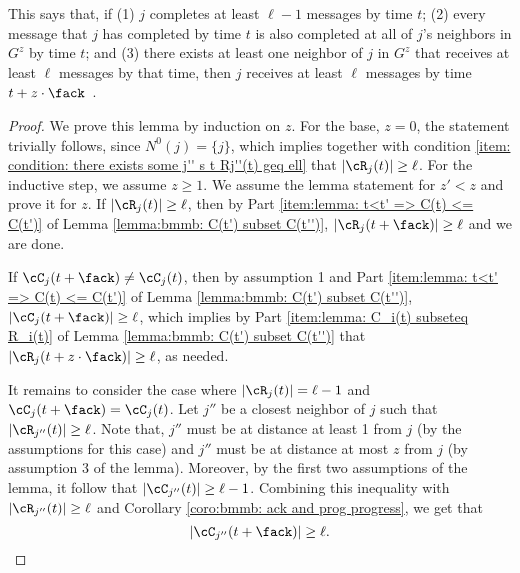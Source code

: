 \noindent This says that, if
(1) $j$ completes at least $\ell-1$ messages by time $t$;
(2) every message that $j$ has completed by time $t$ is also completed at all of $j$'s
neighbors in $G^z$ by time $t$; and
(3) there exists at least one neighbor of $j$ in $G^z$ that receives at least $\ell$ messages by that time,
then $j$ receives
at least $\ell$ messages by time $t+ z\cdot \fack$~.


\begin{proof}
We prove this lemma by induction on $z$.
For the base, $z= 0$, the statement trivially follows, since $N^0(j)=\{j\}$, which implies together with condition
\ref{item: condition: there exists some j'' s t Rj''(t) geq ell} that $|\cR_{j}(t) |\geq \ell$.
For the inductive step, we assume $z \geq 1$.
We assume the lemma statement for $z'<z$ and prove it for $z$.
If $|\cR_j(t)| \geq \ell$, then
by Part \ref{item:lemma: t<t' => C(t) <= C(t')}
of Lemma \ref{lemma:bmmb: C(t') subset C(t'')},
$|\cR_j(t+\fack)| \geq \ell$ and we are done.


If $\cC_{j}(t+\fack) \not= \cC_{j}(t)$, then by  assumption 1
and Part
\ref{item:lemma: t<t' => C(t) <= C(t')}
of Lemma \ref{lemma:bmmb: C(t') subset C(t'')},
$|\cC_{j}(t+\fack)|\geq \ell$,
which implies
by Part \ref{item:lemma: C_i(t) subseteq R_i(t)}
of Lemma \ref{lemma:bmmb: C(t') subset C(t'')}
that $|\cR_{j}(t+z\cdot \fack)|\geq \ell$, as needed.


It remains to consider the case where $|\cR_j(t)| = \ell-1$ and  $\cC_{j}(t+\fack) = \cC_{j}(t)$.
Let $j''$ be a closest neighbor of $j$ such that $|\cR_{j''}(t)| \geq \ell$.
Note that, $j''$ must be at distance at least 1 from $j$ (by the assumptions for this case) and $j''$ must be at distance at most $z$ from $j$ (by assumption 3 of the lemma).
Moreover, by the first two assumptions of the lemma, it follow that $|\cC_{j''}(t)| \geq \ell-1$.
Combining this inequality with  $|\cR_{j''}(t)| \geq \ell$ and
Corollary \ref{coro:bmmb: ack and prog progress},
we get that
\begin{equation}
|\cC_{j''}(t+\fack)| \geq \ell.
\label{ineq:lemma:|C_j''(t + Ffac)| geq ell}
\end{equation}



\end{proof}
